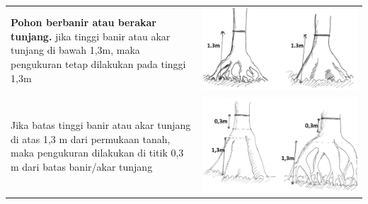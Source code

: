 \documentclass[
  oneside]{book}
\begin{document}
\begin{longtable}[]{@{}
  >{\raggedright\arraybackslash}p{}
  >{\raggedright\arraybackslash}p{}@{}}
\textbf{Pohon berbanir atau berakar tunjang.} jika tinggi banir atau akar tunjang di bawah 1,3m, maka pengukuran tetap dilakukan pada tinggi 1,3m & \includegraphics{images/vtb4.jpg} \\
Jika batas tinggi banir atau akar tunjang di atas 1,3 m dari permukaan tanah, maka pengukuran dilakukan di titik 0,3 m dari batas banir/akar tunjang & \includegraphics{images/vtb5.jpg} \\

\end{longtable}
\end{document}
